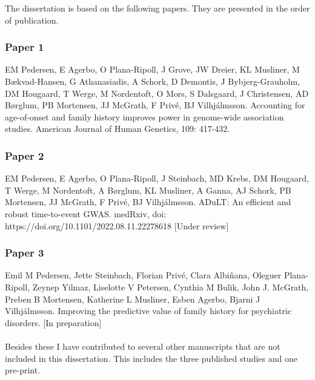 The dissertation is based on the following papers. They are presented in the order of publication.
\subsubsection{Paper 1}
EM Pedersen, E Agerbo, O Plana-Ripoll, J Grove, JW Dreier, KL Musliner, M Bækvad-Hansen, G Athanasiadis, A Schork, D Demontis, J Bybjerg-Grauholm, DM Hougaard, T Werge, M Nordentoft, O Mors, S Dalsgaard, J Christensen,  AD Børglum, PB Mortensen, JJ McGrath, F Privé, BJ Vilhjálmsson. Accounting for age-of-onset and family history improves power in genome-wide association studies. American Journal of Human Genetics, 109: 417-432.

\subsubsection{Paper 2}
EM Pedersen, E Agerbo, O Plana-Ripoll, J Steinbach, MD Krebs, DM Hougaard, T Werge, M Nordentoft, A Børglum,  KL Musliner, A Ganna, AJ Schork, PB Mortensen,  JJ McGrath,  F Privé, BJ Vilhjálmsson. ADuLT: An efficient and robust time-to-event GWAS. medRxiv, doi: https://doi.org/10.1101/2022.08.11.22278618 [Under review]

\subsubsection{Paper 3}
Emil M Pedersen, Jette Steinbach, Florian Privé, Clara Albiñana, Oleguer Plana-Ripoll, Zeynep Yilmaz, Liselotte V Petersen, Cynthia M Bulik, John J. McGrath, Preben B Mortensen, Katherine L Musliner, Esben Agerbo, Bjarni J Vilhjálmsson. Improving the predictive value of family history for psychiatric disorders. [In preparation]
\mbox{}\\
\mbox{}\\
Besides these I have contributed to several other manuscripts that are not included in this dissertation. This includes the three published studies and one pre-print.

